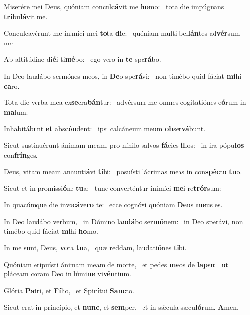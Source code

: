 \item Miserére mei Deus, quóniam concul\textbf{cá}vit me \textbf{ho}mo:~\psstar{} tota die impúgnans \textbf{tri}bu\textbf{lá}vit me.
\item Conculcavérunt me inimíci mei \textbf{to}ta \textbf{di}e:~\psstar{} quóniam multi bel\textbf{lán}tes ad\textbf{vér}sum me.
\item Ab altitúdine di\textbf{é}i ti\textbf{mé}bo:~\psstar{} ego vero in \textbf{te} spe\textbf{rá}bo.
\item In Deo laudábo sermónes meos, in \textbf{De}o spe\textbf{rá}vi:~\psstar{} non timébo quid fáciat \textbf{mi}hi \textbf{ca}ro.
\item Tota die verba mea ex\textbf{se}cra\textbf{bán}tur:~\psstar{} advérsum me omnes cogitatiónes e\textbf{ó}rum in \textbf{ma}lum.
\item Inhabitábunt \textbf{et} abs\textbf{cón}\-dent:~\psstar{} ipsi calcáneum meum \textbf{ob}ser\textbf{vá}bunt.
\item Sicut sustinuérunt ánimam meam, pro níhilo salvos \textbf{fá}cies \textbf{il}los:~\psstar{} in ira pópu\textbf{los} con\textbf{frín}ges.
\item Deus, vitam meam annunti\textbf{á}vi \textbf{ti}bi:~\psstar{} posuísti lácrimas meas in con\textbf{spéc}tu \textbf{tu}o.
\item Sicut et in promissi\textbf{ó}ne \textbf{tu}a:~\psstar{} tunc converténtur inimíci \textbf{me}i re\textbf{trór}sum:
\item In quacúmque die invo\textbf{cá}ve\textbf{ro} te:~\psstar{} ecce cognóvi quóniam \textbf{De}us \textbf{me}us es.
\item In Deo laudábo verbum,~\pscross{} in Dómino lau\textbf{dá}bo ser\textbf{mó}nem:~\psstar{} in Deo sperávi, non timébo quid fáciat \textbf{mi}hi \textbf{ho}mo.
\item In me sunt, Deus, \textbf{vo}ta \textbf{tu}a,~\psstar{} quæ reddam, laudati\textbf{ó}nes \textbf{ti}bi.
\item Quóniam eripuísti ánimam meam de morte,~\pscross{} et pedes \textbf{me}os de \textbf{lap}su:~\psstar{} ut pláceam coram Deo in lúmi\textbf{ne} vi\textbf{vén}tium.
\item Glória \textbf{Pa}tri, et \textbf{Fí}lio,~\psstar{} et Spi\textbf{rí}tui \textbf{Sanc}to.
\item Sicut erat in princípio, et \textbf{nunc}, et \textbf{sem}per,~\psstar{} et in sǽcula sæcu\textbf{ló}rum. \textbf{A}men.
